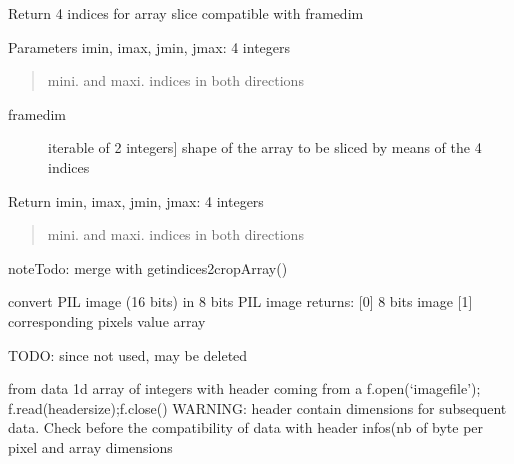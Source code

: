 \documentclass[letterpaper,10pt,english]{sphinxmanual}
\begin{document}

\begin{fulllineitems}
\label{\detokenize{PeakSearch:LaueTools.readmccd.check_array_indices}}
Return 4 indices for array slice compatible with framedim

Parameters
imin, imax, jmin, jmax: 4 integers
\begin{quote}

mini. and maxi. indices in both directions
\end{quote}
\begin{description}
\item[{framedim}] \leavevmode{[}iterable of 2 integers{]}
shape of the array to be sliced by means of the 4 indices

\end{description}

Return
imin, imax, jmin, jmax: 4 integers
\begin{quote}

mini. and maxi. indices in both directions
\end{quote}

\begin{sphinxadmonition}{note}{\label{PeakSearch:index-1}Todo:}
merge with getindices2cropArray()
\end{sphinxadmonition}

\end{fulllineitems}


\begin{fulllineitems}
\label{\detokenize{PeakSearch:LaueTools.readmccd.to8bits}}
convert PIL image (16 bits) in 8 bits PIL image
returns:
{[}0{]}  8 bits image
{[}1{]} corresponding pixels value array

TODO: since not used, may be deleted

\end{fulllineitems}


\begin{fulllineitems}
\label{\detokenize{PeakSearch:LaueTools.readmccd.writeimage}}
from data 1d array of integers
with header coming from a f.open(‘imagefile’); f.read(headersize);f.close()
WARNING: header contain dimensions for subsequent data. Check before the compatibility of
data with header infos(nb of byte per pixel and array dimensions

\end{fulllineitems}
\end{document}
